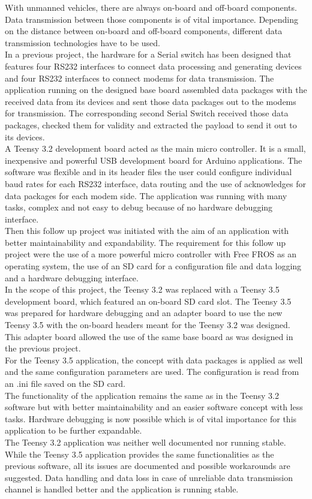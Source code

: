 %
With unmanned vehicles, there are always on-board and off-board components. Data transmission between those components is of vital importance. Depending on the distance between on-board and off-board components, different data transmission technologies have to be used. \\
In a previous project, the hardware for a Serial switch has been designed that features four RS232 interfaces to connect data processing and generating devices and four RS232 interfaces to connect modems for data transmission. The application running on the designed base board assembled data packages with the received data from its devices and sent those data packages out to the modems for transmission. The corresponding second Serial Switch received those data packages, checked them for validity and extracted the payload to send it out to its devices.\\
A Teensy 3.2 development board acted as the main micro controller. It is a small, inexpensive and powerful USB development board for Arduino applications. The software was flexible and in its header files the user could configure individual baud rates for each RS232 interface, data routing and the use of acknowledges for data packages for each modem side. The application was running with many tasks, complex and not easy to debug because of no hardware debugging interface.\\
Then this follow up project was initiated with the aim of an application with better maintainability and expandability. The requirement for this follow up project were the use of a more powerful micro controller with Free FROS as an operating system, the use of an SD card for a configuration file and data logging and a hardware debugging interface.\\
In the scope of this project, the Teensy 3.2 was replaced with a Teensy 3.5 development board, which featured an on-board SD card slot. The Teensy 3.5 was prepared for hardware debugging and an adapter board to use the new Teensy 3.5 with the on-board headers meant for the Teensy 3.2 was designed. This adapter board allowed the use of the same base board as was designed in the previous project.\\
For the Teensy 3.5 application, the concept with data packages is applied as well and the same configuration parameters are used. The configuration is read from an .ini file saved on the SD card.\\
The functionality of the application remains the same as in the Teensy 3.2 software but with better maintainability and an easier software concept with less tasks. Hardware debugging is now possible which is of vital importance for this application to be further expandable.\\
The Teensy 3.2 application was neither well documented nor running stable. While the Teensy 3.5 application provides the same functionalities as the previous software, all its issues are documented and possible workarounds are suggested. Data handling and data loss in case of unreliable data transmission channel is handled better and the application is running stable.